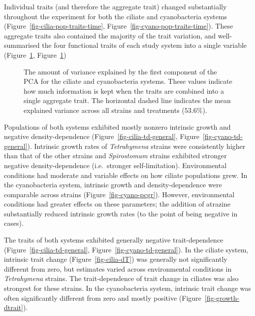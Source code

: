 \documentclass[
  letterpaper,
  DIV=11,
  numbers=noendperiod]{scrartcl}
\begin{document}
Individual traits (and therefore the aggregate trait) changed
substantially throughout the experiment for both the ciliate and
cyanobacteria systems (Figure~\ref{fig-cilia-pop-traits-time},
Figure~\ref{fig-cyano-pop-traits-time}). These aggregate traits also
contained the majority of the trait variation, and well-summarised the
four functional traits of each study system into a single variable
(Figure~\ref{fig-PC-var-explained}, Figure~\ref{fig-PC-var-explained})

\begin{figure}


\caption{\label{fig-PC-var-explained}The amount of variance explained by
the first component of the PCA for the ciliate and cyanobacteria
systems. These values indicate how much information is kept when the
traits are combined into a single aggregate trait. The horizontal dashed
line indicates the mean explained variance across all strains and
treatments (\(53.6\%\)).}

\end{figure}%

Populations of both systems exhibited mostly nonzero intrinsic growth
and negative density-dependence (Figure~\ref{fig-cilia-td-general},
Figure~\ref{fig-cyano-td-general}). Intrinsic growth rates of
\emph{Tetrahymena} strains were consistently higher than that of the
other strains and \emph{Spirostomum} strains exhibited stronger negative
density-dependence (i.e.~stronger self-limitation). Environmental
conditions had moderate and variable effects on how ciliate populations
grew. In the cyanobacteria system, intrinsic growth and
density-dependence were comparable across strains
(Figure~\ref{fig-cyano-pcgr}). However, environmental conditions had
greater effects on these parameters; the addition of atrazine
substantially reduced intrinsic growth rates (to the point of being
negative in cases).

The traits of both systems exhibited generally negative trait-dependence
(Figure~\ref{fig-cilia-td-general}, Figure~\ref{fig-cyano-td-general}).
In the ciliate system, intrinsic trait change
(Figure~\ref{fig-cilia-dT}) was generally not significantly different
from zero, but estimates varied across environmental conditions in
\emph{Tetrahymena} strains. The trait-dependence of trait change in
ciliates was also strongest for these strains. In the cyanobacteria
system, intrinsic trait change was often significantly different from
zero and mostly positive (Figure~\ref{fig-growth-dtrait}).
\end{document}
